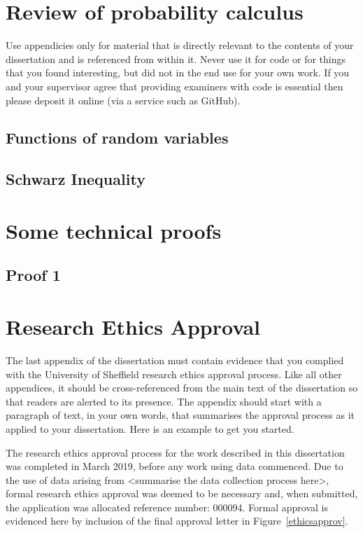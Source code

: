 
\appendix

\chapter{Review of probability calculus}\label{apx:prob}

Use appendicies only for material that is directly relevant to the contents of your dissertation and is referenced from within it.  Never use it for code or for things that you found interesting, but did not in the end use for your own work.  If you and your supervisor agree that providing examiners with code is essential then please deposit it online (via a service such as GitHub).

\section{Functions of random variables}
\section{Schwarz Inequality}


\chapter{Some technical proofs}\label{apx:proofs}

\section{Proof 1}


\chapter{Research Ethics Approval}\label{apx:ethics}

The last appendix of the dissertation must contain evidence that you complied with the University of Sheffield research ethics approval process. Like all other appendices, it should be cross-referenced from the main text of the dissertation so that readers are alerted to its presence. The appendix should start with a paragraph of text, in your own words, that summarises the approval process as it applied to your dissertation. Here is an example to get you started.

The research ethics approval process for the work described in this dissertation was completed in March 2019, before any work using data commenced. Due to the use of data arising from <summarise the data collection process here>, formal research ethics approval was deemed to be necessary and, when submitted, the application was allocated reference number: 000094. Formal approval is evidenced here by inclusion of the final approval letter in Figure~\ref{ethicsapprov}. 

